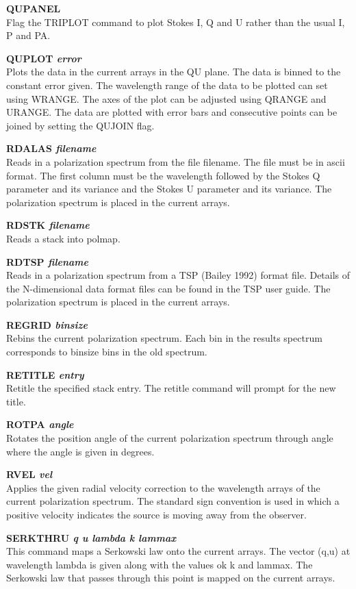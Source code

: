 \documentclass[11pt,nolof,noabs]{starlink}
\begin{document}
\textbf{QUPANEL} \\
Flag the TRIPLOT command to plot Stokes I, Q and U rather than the
usual I, P and PA.

\textbf{QUPLOT \it error } \\
Plots the data in the current arrays in the QU plane. The data is
binned to the constant error given. The wavelength range of the data
to be plotted can set using WRANGE. The axes of the plot can be
adjusted using QRANGE and URANGE. The data are plotted with error bars
and consecutive points can be joined by setting the QUJOIN flag.

\textbf{RDALAS \it filename } \\
Reads in a polarization spectrum from the file filename. The file must
be in ascii format. The first column must be the wavelength followed
by the Stokes Q parameter and its variance and the Stokes U parameter
and its variance.  The polarization spectrum is placed in the current
arrays.

\textbf{RDSTK \it filename } \\
Reads a stack into  polmap.

\textbf{RDTSP \it filename } \\
Reads in a polarization spectrum from a  TSP (Bailey 1992) format file.
Details of the N-dimensional data format files can be found in the  TSP
user guide. The polarization spectrum is placed in the current arrays.

\textbf{REGRID \it binsize} \\
Rebins the current polarization spectrum. Each bin in the results spectrum
corresponds to binsize bins in the old spectrum.

\textbf{RETITLE \it entry} \\
Retitle the specified stack entry. The retitle command will prompt for the
new title.

\textbf{ROTPA \it angle } \\
Rotates the position angle of the current polarization spectrum through
angle where the angle is given in degrees.

\textbf{RVEL \it vel} \\
Applies the given radial velocity correction to the wavelength arrays
of the current polarization spectrum. The standard sign convention is
used in which a positive velocity indicates the source is moving away
from the observer.

\textbf{SERKTHRU \it q u lambda k lammax} \\
This command maps a Serkowski law onto the current arrays. The vector
(q,u) at wavelength lambda is given along with the values ok k and
lammax. The Serkowski law that passes through this point is mapped on
the current arrays.
\end{document}
